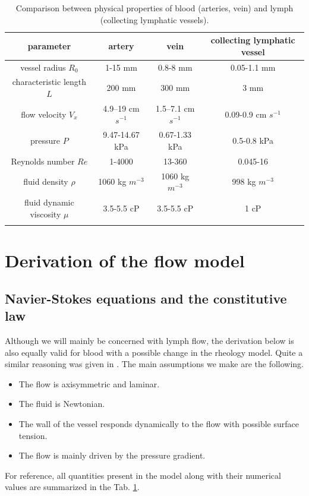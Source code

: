 \documentclass[12pt,a4paper]{article}
\begin{document}
\begin{table}
	\centering
	\begin{tabular}{cccc}
		\toprule  
		parameter & artery & vein & collecting lymphatic vessel \\ [0.5ex] 
		\midrule
        vessel radius $R_0$ & 1-15 mm \cite{muller2014global} & 0.8-8 mm \cite{muller2014global} & 0.05-1.1 mm \cite{contarino2018one} \cite{moore2018lymphatic}\\
        characteristic length $L$ & 200 mm \cite{muller2014global} & 300 mm \cite{muller2014global} & 3 mm \cite{jamalian2016network} \\
        flow velocity $V_x$ & 4.9–19 cm $s^{-1}$ \cite{klarhofer2001high} & 1.5–7.1 cm $s^{-1}$ \cite{klarhofer2001high} & 0.09-0.9 cm $s^{-1}$ \cite{zawieja2009contractile}\\
        pressure $P$ &   9.47-14.67 kPa \cite{woloszyn2012retrospective} &  0.67-1.33 kPa \cite{KAMATH2018233}&  0.5-0.8 kPa \cite{macdonald2008modeling}\\
        Reynolds number $Re$ & 1-4000 \cite{ku1997blood} & 13-360 \cite{saleem2023assessment}& 0.045-16 \cite{moore2018lymphatic} \\
        fluid density $\rho$ & 1060 kg $m^{-3}$ \cite{anliker1971nonlinear} & 1060 kg $m^{-3}$ \cite{anliker1971nonlinear} & 998 kg $m^{-3}$ \cite{macdonald2008modeling} \\
        fluid dynamic viscosity $\mu$ & 3.5-5.5 cP \cite{nader2019blood} & 3.5-5.5 cP \cite{nader2019blood} & 1 cP \cite{bertram2011chain}\\
		\\ [1ex] 
		\bottomrule
	\end{tabular}
    \label{tab:BloodLymph}
    \caption{Comparison between physical properties of blood (arteries, vein) and lymph (collecting lymphatic vessels). }
\end{table}

\section{Derivation of the flow model}
\subsection{Navier-Stokes equations and the constitutive law}
Although we will mainly be concerned with lymph flow, the derivation below is also equally valid for blood with a possible change in the rheology model. Quite a similar reasoning was given in \cite{smith2002anatomically}. The main assumptions we make are the following.
\begin{itemize}
	\item The flow is axisymmetric and laminar.
	\item The fluid is Newtonian. 
	\item The wall of the vessel responds dynamically to the flow with possible surface tension. 
	\item The flow is mainly driven by the pressure gradient. 
\end{itemize}
For reference, all quantities present in the model along with their numerical values are summarized in the Tab. \ref{tab:BloodLymph}. 
\end{document}
